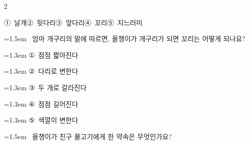 \documentclass[12pt, a4paper]{article}
\begin{document}
\begin{multicols}{2}
\begin{minipage}{\columnwidth}
\vspace{0.5mm}
\noindent
\mbox{①~날개}\hspace{1em}\mbox{②~뒷다리}\hspace{1em}\mbox{③~앞다리}\hspace{1em}\mbox{④~꼬리}\hspace{1em}\mbox{⑤~지느러미}

\vspace{4mm}
\end{minipage}
\par

\noindent\begin{minipage}{\columnwidth}
\vspace{2mm}
{\hangindent=1.5em  ~엄마 개구리의 말에 따르면, 올챙이가 개구리가 되면 꼬리는 어떻게 되나요?\par}

\vspace{0.5mm}
{\hangindent=1.3em  \noindent\hspace{0.3em}①~점점 짧아진다\par}
{\hangindent=1.3em  \noindent\hspace{0.3em}②~다리로 변한다\par}
{\hangindent=1.3em  \noindent\hspace{0.3em}③~두 개로 갈라진다\par}
{\hangindent=1.3em  \noindent\hspace{0.3em}④~점점 길어진다\par}
{\hangindent=1.3em  \noindent\hspace{0.3em}⑤~색깔이 변한다\par}
\vspace{4mm}
\end{minipage}
\par

\noindent\begin{minipage}{\columnwidth}
\vspace{2mm}
{\hangindent=1.5em  ~올챙이가 친구 물고기에게 한 약속은 무엇인가요?\par}


\end{minipage}
\end{multicols}
\end{document}
